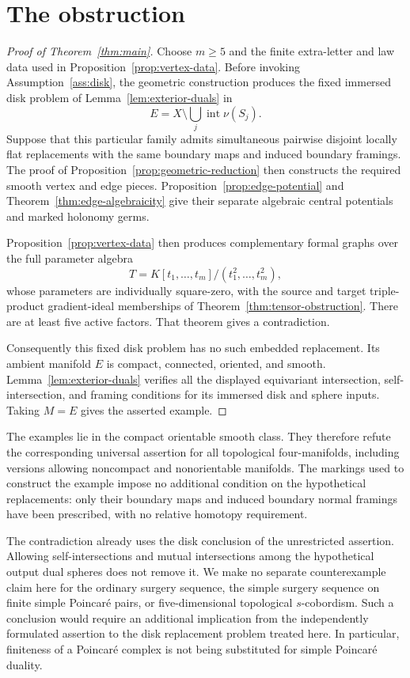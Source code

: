 \section{The obstruction}\label{sec:conclusion}

\begin{proof}[Proof of Theorem~\ref{thm:main}]
Choose \(m\geq5\) and the finite extra-letter and law data used in
Proposition~\ref{prop:vertex-data}. Before invoking
Assumption~\ref{ass:disk}, the geometric construction produces the fixed
immersed disk problem of Lemma~\ref{lem:exterior-duals} in
\[
 E=X\setminus\bigcup_j\operatorname{int}\nu(S_j).
\]
Suppose that this particular family admits simultaneous pairwise disjoint
locally flat replacements with the same boundary maps and induced boundary
framings. The proof of Proposition~\ref{prop:geometric-reduction} then
constructs the required smooth vertex and edge pieces.
Proposition~\ref{prop:edge-potential} and
Theorem~\ref{thm:edge-algebraicity} give their separate algebraic central
potentials and marked holonomy germs.

Proposition~\ref{prop:vertex-data} then produces complementary formal graphs
over the full parameter algebra
\[
 T=K[t_1,\ldots,t_m]/(t_1^2,\ldots,t_m^2),
\]
whose parameters are individually square-zero, with the source and target
triple-product gradient-ideal memberships of
Theorem~\ref{thm:tensor-obstruction}. There are at least five active factors.
That theorem gives a contradiction.

Consequently this fixed disk problem has no such embedded replacement.
Its ambient manifold \(E\) is compact, connected, oriented, and smooth.
Lemma~\ref{lem:exterior-duals} verifies all the displayed equivariant
intersection, self-intersection, and framing conditions for its immersed
disk and sphere inputs. Taking \(M=E\) gives the asserted example.
\end{proof}

\begin{remark}
The examples lie in the compact orientable smooth class. They therefore
refute the corresponding universal assertion for all topological
four-manifolds, including versions allowing noncompact and nonorientable
manifolds. The markings used to construct the example impose no additional
condition on the hypothetical replacements: only their boundary maps and
induced boundary normal framings have been prescribed, with no relative
homotopy requirement.

The contradiction already uses the disk conclusion of the unrestricted
assertion. Allowing self-intersections and mutual intersections among the
hypothetical output dual spheres does not remove it. We make no separate
counterexample claim here for the ordinary surgery sequence, the simple
surgery sequence on finite simple Poincar\'e pairs, or five-dimensional
topological \(s\)-cobordism. Such a conclusion would require an additional
implication from the independently formulated assertion to the disk
replacement problem treated here. In particular, finiteness of a
Poincar\'e complex is not being substituted for simple Poincar\'e duality.
\end{remark}
